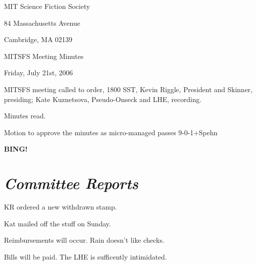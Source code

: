 \documentclass[10pt]{article}
\newcommand{\bing}{{\bf BING!} }
\newcommand{\goto}[1]{\bing \vskip 12pt \section*{{\em{#1}}}}
\begin{document}
\begin{center}

MIT Science Fiction Society

84 Massachusetts Avenue

Cambridge, MA 02139

\vspace{12pt}

MITSFS Meeting Minutes

Friday, July 21st, 2006

\end{center}

\vspace{18pt}

\setlength{\parskip}{6pt}

\noindent
MITSFS meeting called to order, 1800 SST,
Kevin Riggle, President and Skinner, presiding; Kate Kuznetsova, Pseudo-Onseck and LHE, recording.

Minutes read.

Motion to approve the minutes as micro-managed passes 9-0-1+Spehn

\goto{Committee Reports}


KR ordered a new withdrawn stamp.

Kat mailed off the stuff on Sunday.


Reimbursements will occur. Rain doesn't like checks.

Bills will be paid. The LHE  is sufficently intimidated.



\end{document}
